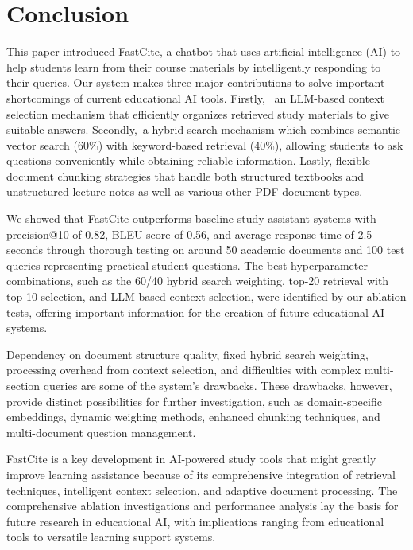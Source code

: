 \documentclass[runningheads]{llncs}
\begin{document}
%
%
\section{Conclusion}

This paper introduced FastCite, a chatbot that uses artificial intelligence (AI) to help students learn from their course materials by intelligently responding to their queries.  Our system makes three major contributions to solve important shortcomings of current educational AI tools. Firstly,  an LLM-based context selection mechanism that efficiently organizes retrieved study materials to give suitable answers. Secondly, a hybrid search mechanism which combines semantic vector search (60\%) with keyword-based retrieval (40\%), allowing students to ask questions conveniently while obtaining reliable information. Lastly, flexible document chunking strategies that handle both structured textbooks and unstructured lecture notes as well as various other PDF document types.

We showed that FastCite outperforms baseline study assistant systems with precision@10 of 0.82, BLEU score of 0.56, and average response time of 2.5 seconds through thorough testing on around 50 academic documents and 100 test queries representing practical student questions. The best hyperparameter combinations, such as the 60/40 hybrid search weighting, top-20 retrieval with top-10 selection, and LLM-based context selection, were identified by our ablation tests, offering important information for the creation of future educational AI systems.

Dependency on document structure quality, fixed hybrid search weighting, processing overhead from context selection, and difficulties with complex multi-section queries are some of the system's drawbacks. These drawbacks, however, provide distinct possibilities for further investigation, such as domain-specific embeddings, dynamic weighing methods, enhanced chunking techniques, and multi-document question management.

FastCite is a key development in AI-powered study tools that might greatly improve learning assistance because of its comprehensive integration of retrieval techniques, intelligent context selection, and adaptive document processing. The comprehensive ablation investigations and performance analysis lay the basis for future research in educational AI, with implications ranging from educational tools to versatile learning support systems.
\end{document}
